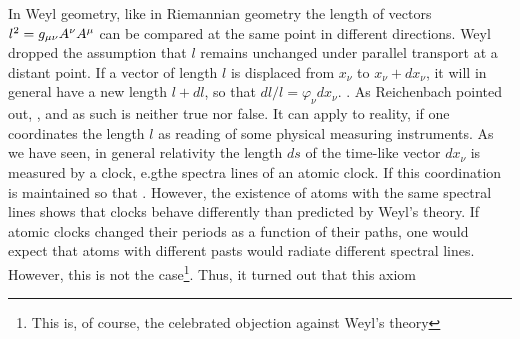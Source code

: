 \documentclass[draft]{article}
\newcommand{\phin}{\ensuremath{\varphi_\nu}\xspace}
\newcommand{\WT}{Weyl's theory\xspace}
\begin{document}

\begin{W}
\item\label{W1} In Weyl geometry, like in Riemannian geometry the length of vectors  $l^2=g_{\mu\nu} A^\nu A^\mu$ can be compared at the same point in different directions. Weyl dropped the assumption that $l$ remains unchanged under parallel transport at a distant point. If a vector of length $l$ is displaced from $x_\nu$ to $x_\nu+dx_\nu$, it will in general have a new length $l+dl$, so that $dl/l=\phin dx_\nu$. . As Reichenbach pointed out,  \citep[366]{Reichenbach1922a}, and as such is neither true nor false. It can apply to reality, if one coordinates the length $l$ as reading of some physical measuring instruments. As we have seen, in general relativity the length $ds$ of the time-like vector $dx_\nu$ is measured by a clock, e.g\. the spectra lines of an atomic clock. If this coordination is maintained so that  \citep[366]{Reichenbach1922a}. However, the existence of atoms with the same spectral lines shows that clocks behave differently than predicted by \WT. If atomic clocks changed their periods as a function of their \spti paths, one would expect that atoms with different pasts would radiate different spectral lines. However, this is not the case\footnote{This is, of course, the celebrated objection against \WT {}}. Thus, it turned out that this axiom   \citep[366]{Reichenbach1922a}


\end{W}
\end{document}
